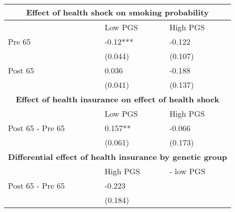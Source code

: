 % 
\begin{tabular}{lll}
  \toprule
  \multicolumn{3}{c}{ \textbf{Effect of health shock on smoking probability}} \\
 \midrule
 & Low PGS & High PGS \\ 
   \midrule
Pre 65 & -0.12*** & -0.122 \\ 
   & (0.044) & (0.107) \\ 
  Post 65 & 0.036 & -0.188 \\ 
   & (0.041) & (0.137) \\ 
   \toprule \multicolumn{3}{c}{ \textbf{Effect of health insurance on effect of health shock}} \\
 \midrule
 & Low PGS & High PGS \\ 
   \midrule
Post 65 - Pre 65 & 0.157** & -0.066 \\ 
   & (0.061) & (0.173) \\ 
   \toprule \multicolumn{3}{c}{ \textbf{Differential effect of health insurance by genetic group}} \\
 \midrule
 & High PGS  & - low PGS \\ 
   \midrule
Post 65 - Pre 65 & -0.223 &  \\ 
   & (0.184) &  \\ 
   \bottomrule
\end{tabular}

